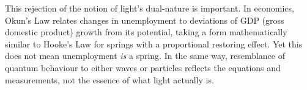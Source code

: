 This rejection of the notion of light's \QSOpen{}dual-nature\QSClose{} is important. In economics, Okun's Law relates changes in unemployment to deviations of GDP (gross domestic product) growth from its potential, taking a form mathematically similar to Hooke's Law for springs with a proportional \QSOpen{}restoring\QSClose{} effect. Yet this does not mean unemployment \textit{is} a spring. In the same way, resemblance of quantum behaviour to either waves or particles reflects the equations and measurements, not the essence of what light actually is.